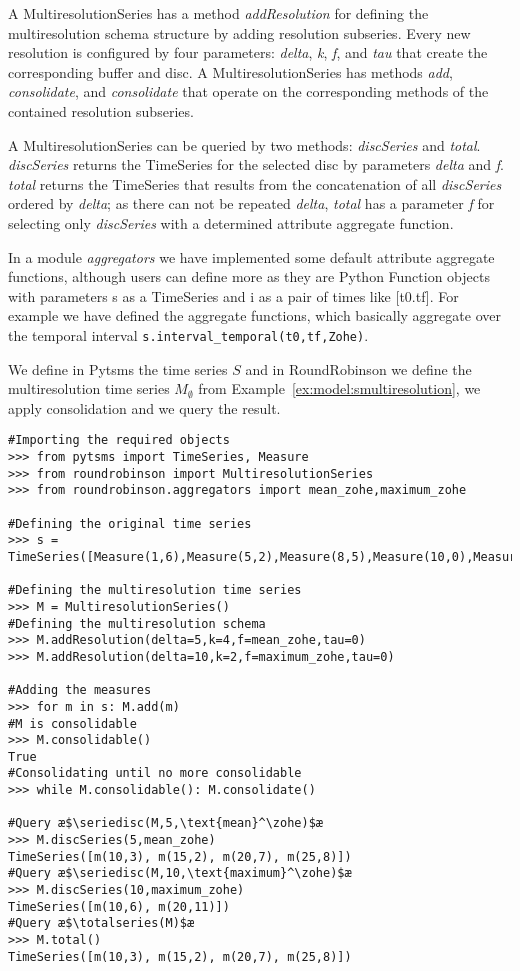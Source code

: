 A MultiresolutionSeries has a method \emph{addResolution} for defining
the multiresolution schema structure by adding resolution
subseries. Every new resolution is configured by four parameters:
\emph{delta}, \emph{k}, \emph{f}, and \emph{tau} that create the
corresponding buffer and disc.  A MultiresolutionSeries has methods
\emph{add}, \emph{consolidate}, and \emph{consolidate} that operate on
the corresponding methods of the contained resolution subseries.


A MultiresolutionSeries can be queried by two methods:
\emph{discSeries} and \emph{total}. \emph{discSeries} returns the
TimeSeries for the selected disc by parameters \emph{delta} and
\emph{f}. \emph{total} returns the TimeSeries that results from the
concatenation of all \emph{discSeries} ordered by \emph{delta}; as
there can not be repeated \emph{delta}, \emph{total} has a parameter
\emph{f} for selecting only \emph{discSeries} with a determined
attribute aggregate function.

In a module \emph{aggregators} we have implemented some default
attribute aggregate functions, although users can define more as they
are Python Function objects with parameters s as a TimeSeries and i as
a pair of times like [t0.tf]. For example we have defined the \zohe
aggregate functions, which basically aggregate over the temporal
interval \lstinline[style=py]+s.interval_temporal(t0,tf,Zohe)+.


\begin{example}
  We define in Pytsms the time series $S$ and in RoundRobinson we
  define the multiresolution time series $M_\emptyset$ from
  Example~\ref{ex:model:smultiresolution}, we apply consolidation and
  we query the result.

\begin{lstlisting}[style=py]
#Importing the required objects
>>> from pytsms import TimeSeries, Measure
>>> from roundrobinson import MultiresolutionSeries
>>> from roundrobinson.aggregators import mean_zohe,maximum_zohe

#Defining the original time series
>>> s = TimeSeries([Measure(1,6),Measure(5,2),Measure(8,5),Measure(10,0),Measure(14,1),Measure(19,6),Measure(22,11),Measure(26,6),Measure(29,0)])

#Defining the multiresolution time series
>>> M = MultiresolutionSeries()
#Defining the multiresolution schema
>>> M.addResolution(delta=5,k=4,f=mean_zohe,tau=0)
>>> M.addResolution(delta=10,k=2,f=maximum_zohe,tau=0)

#Adding the measures
>>> for m in s: M.add(m)
#M is consolidable
>>> M.consolidable()
True
#Consolidating until no more consolidable
>>> while M.consolidable(): M.consolidate()

#Query æ$\seriedisc(M,5,\text{mean}^\zohe)$æ
>>> M.discSeries(5,mean_zohe)
TimeSeries([m(10,3), m(15,2), m(20,7), m(25,8)])
#Query æ$\seriedisc(M,10,\text{maximum}^\zohe)$æ
>>> M.discSeries(10,maximum_zohe)
TimeSeries([m(10,6), m(20,11)])
#Query æ$\totalseries(M)$æ
>>> M.total()
TimeSeries([m(10,3), m(15,2), m(20,7), m(25,8)])
\end{lstlisting}
\end{example}



